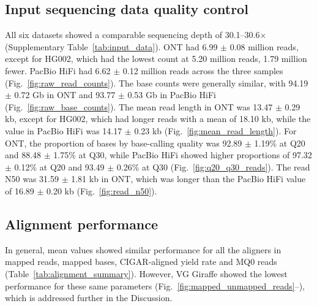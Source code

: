 \documentclass[12pt, letterpaper]{article}
\begin{document}
\subsection{Input sequencing data quality control}

All six datasets showed a comparable sequencing depth of 30.1--30.6$\times$ (Supplementary Table~\ref{tab:input_data}). ONT had 6.99 $\pm$ 0.08 million reads, except for HG002, which had the lowest count at 5.20 million reads, 1.79 million fewer. PacBio HiFi had 6.62 $\pm$ 0.12 million reads across the three samples (Fig.~\ref{fig:raw_read_counts}). The base counts were generally similar, with 94.19 $\pm$ 0.72 Gb in ONT and 93.77 $\pm$ 0.53 Gb in PacBio HiFi (Fig.~\ref{fig:raw_base_counts}). The mean read length in ONT was 13.47 $\pm$ 0.29 kb, except for HG002, which had longer reads with a mean of 18.10 kb, while the value in PacBio HiFi was 14.17 $\pm$ 0.23 kb (Fig.~\ref{fig:mean_read_length}). For ONT, the proportion of bases by base-calling quality was 92.89 $\pm$ 1.19\% at Q20 and 88.48 $\pm$ 1.75\% at Q30, while PacBio HiFi showed higher proportions of 97.32 $\pm$ 0.12\% at Q20 and 93.49 $\pm$ 0.26\% at Q30 (Fig.~\ref{fig:q20_q30_reads}). The read N50 was 31.59 $\pm$ 1.81 kb in ONT, which was longer than the PacBio HiFi value of 16.89 $\pm$ 0.20 kb (Fig.~\ref{fig:read_n50}).

\subsection{Alignment performance}

In general, mean values showed similar performance for all the aligners in mapped reads, mapped bases, CIGAR-aligned yield rate and MQ0 reads (Table~\ref{tab:alignment_summary}). However, VG Giraffe showed the lowest performance for these same parameters (Fig.~\ref{fig:mapped_unmapped_reads}--), which is addressed further in the Discussion.


\alignmentsummarytable
\end{document}
